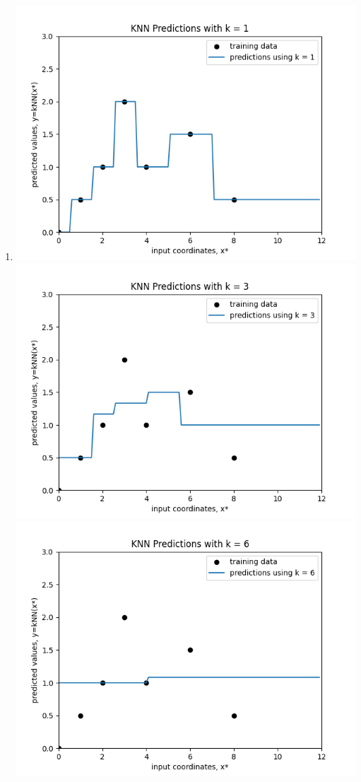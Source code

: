 \documentclass[submit]{harvardml}
\begin{document}
\begin{enumerate}

\item
\includegraphics{k1.png}
\includegraphics{k3.png}
\includegraphics{k6.png}


\end{enumerate}
\end{document}
